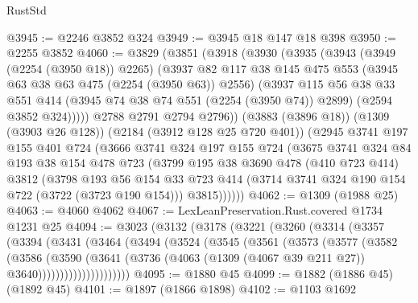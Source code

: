\begin{lexlean}{RustStd}
\begin{coremodule}
@3945 := @2246 @3852 @324
@3949 := @3945 @18 @147 @18 @398
@3950 := @2255 @3852
@4060 := @3829
    (@3851
      (@3918
        (@3930
          (@3935
            (@3943
              (@3949 (@2254 (@3950 @18)) @2265)
              (@3937
                @82
                @117
                @38
                @145
                @475
                @553
                (@3945 @63 @38 @63 @475 (@2254 (@3950 @63)) @2556)
                (@3937
                  @115
                  @56
                  @38
                  @33
                  @551
                  @414
                  (@3945 @74 @38 @74 @551 (@2254 (@3950 @74)) @2899)
                  (@2594 @3852 @324)))))
          @2788
          @2791
          @2794
          @2796))
      (@3883 (@3896 @18))
      (@1309 (@3903 @26 @128))
      (@2184 (@3912 @128 @25 @720 @401))
      (@2945
        @3741
        @197
        @155
        @401
        @724
        (@3666
          @3741
          @324
          @197
          @155
          @724
          (@3675
            @3741
            @324
            @84
            @193
            @38
            @154
            @478
            @723
            (@3799
              @195
              @38
              @3690
              @478
              (@410 @723 @414)
              @3812
              (@3798
                @193
                @56
                @154
                @33
                @723
                @414
                (@3714 @3741 @324 @190 @154 @722 (@3722 (@3723 @190 @154)))
                @3815))))))
@4062 := @1309 (@1988 @25)
@4063 := @4060 @4062
@4067 := LexLeanPreservation.Rust.covered @1734 @1231 @25
@4094 := @3023
    (@3132
      (@3178
        (@3221
          (@3260
            (@3314
              (@3357
                (@3394
                  (@3431
                    (@3464
                      (@3494
                        (@3524
                          (@3545
                            (@3561
                              (@3573
                                (@3577
                                  (@3582
                                    (@3586
                                      (@3590
                                        (@3641
                                          (@3736
                                            (@4063
                                              (@1309 (@4067 @39 @211 @27))
                                              @3640)))))))))))))))))))))
@4095 := @1880 @45
@4099 := @1882 (@1886 @45) (@1892 @45)
@4101 := @1897 (@1866 @1898)
@4102 := @1103 @1692

\end{coremodule}
\end{lexlean}
